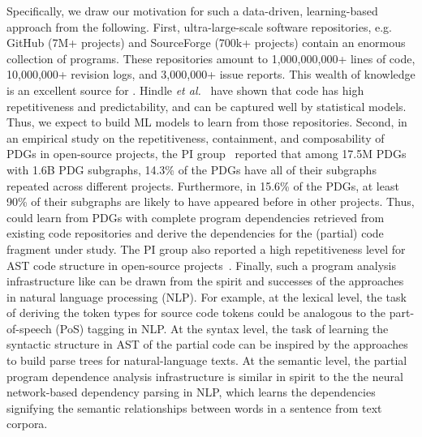 Specifically, we draw our motivation for such a data-driven,
learning-based approach from the following. First, ultra-large-scale
software repositories, e.g. GitHub (7M+ projects) and SourceForge
(700k+ projects) contain an enormous collection of programs. These
repositories amount to 1,000,000,000+ lines of code, 10,000,000+
revision logs, and 3,000,000+ issue reports. This wealth of knowledge
is an excellent source for {\tool}. Hindle {\em et
  al.}~\cite{naturalness-icse12} have shown that code has high
repetitiveness and predictability, and can be captured well by
statistical models. Thus, we expect to build ML models to learn from
those repositories. Second, in an empirical study on the
repetitiveness, containment, and composability of PDGs in open-source
projects, the PI group~\cite{msr16} reported that among 17.5M PDGs
with 1.6B PDG subgraphs, 14.3\% of the PDGs have all of their
subgraphs repeated across different projects. Furthermore, in 15.6\%
of the PDGs, at least 90\% of their subgraphs are likely to have
appeared before in other projects. Thus, {\tool} could learn from PDGs
with complete program dependencies retrieved from existing code
repositories and derive the dependencies for the (partial) code
fragment under study. The PI group also reported a high
repetitiveness level for AST code structure in open-source
projects~\cite{icse15}. Finally, such a program analysis
infrastructure like {\tool} can be drawn from the spirit and successes
of the approaches in natural language processing (NLP). For example,
at the lexical level, the task of deriving the token types for source
code tokens could be analogous to the part-of-speech (PoS) tagging in
NLP. At the syntax level, the task of learning the syntactic structure
in AST of the partial code can be inspired by the approaches to build
parse trees for natural-language texts. At the semantic level, the
partial program dependence analysis infrastructure is similar in
spirit to the the neural network-based dependency parsing in NLP,
which learns the dependencies signifying the semantic relationships
between words in a sentence from text corpora.

